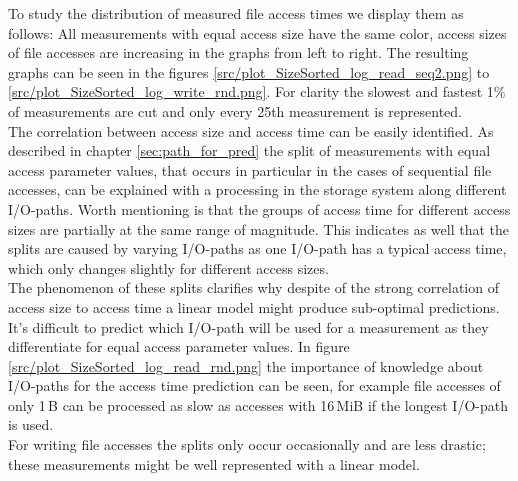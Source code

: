 \documentclass{superfri}
\begin{document}
To study the distribution of measured file access times we display them as follows:
All measurements with equal access size have the same color, access sizes of file accesses are increasing in the graphs from left to right.
The resulting graphs can be seen in the figures \ref{src/plot_SizeSorted_log_read_seq2.png} to \ref{src/plot_SizeSorted_log_write_rnd.png}.
For clarity the slowest and fastest 1\% of measurements are cut and only every 25th measurement is represented.\\
The correlation between access size and access time can be easily identified.
As described in chapter \ref{sec:path_for_pred} the split of measurements with equal access parameter values, that occurs in particular in the cases of sequential file accesses, can be explained with a processing in the storage system along different I/O-paths.
Worth mentioning is that the groups of access time for different access sizes are partially at the same range of magnitude.
This indicates as well that the splits are caused by varying I/O-paths as one I/O-path has a typical access time, which only changes slightly for different access sizes.\\
The phenomenon of these splits clarifies why despite of the strong correlation of access size to access time a linear model might produce sub-optimal predictions. It's difficult to predict which I/O-path will be used for a measurement as they differentiate for equal access parameter values.
In figure \ref{src/plot_SizeSorted_log_read_rnd.png} the importance of knowledge about I/O-paths for the  access time prediction can be seen, for example file accesses of only 1\,B can be processed as slow as accesses with 16\,MiB if the longest I/O-path is used.\\
For writing file accesses the splits only occur occasionally and are less drastic; these measurements might be well represented with a linear model.
\end{document}
